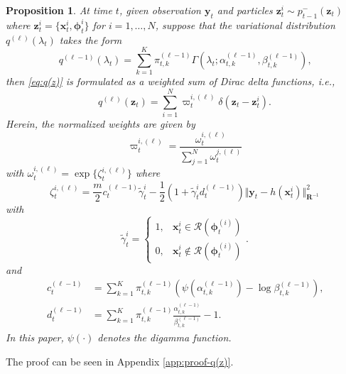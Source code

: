 \documentclass[10pt,twocolumn,twoside]{IEEEtran}
\newtheorem{proposition}{Proposition}
\newcommand{\cm}{\text{,}} %
\newcommand{\fs}{\text{.}} %
\newcommand{\x}{{ \bm{x} }}
\newcommand{\y}{{ \bm{y} }}
\newcommand{\z}{{ \bm{z} }}
\begin{document}
\begin{proposition} \label{prop:q(z)}
At time $t$, given observation $\y_t$ and particles $\z_t^i\sim p^-_{t-1}(\z_t)$ where $\z_t^i=\{\x_t^i,\bm\phi_t^i\}$ for $i=1,\dots,N$, suppose that the variational distribution $q^{(\ell)}(\lambda_t)$ takes the form 
$$q^{(\ell-1)}(\lambda_t)=\sum_{k=1}^K\pi_{t,k}^{(\ell-1)}\Gamma(\lambda_t;\alpha_{t,k}^{(\ell-1)},\beta_{t,k}^{(\ell-1)})\cm$$
then \eqref{eq:q(z)} is formulated as a weighted sum of Dirac delta functions, i.e.,
\begin{equation} \label{eq:q(l)(z)}
    q^{(\ell)}(\z_t) = \sum_{i=1}^{N}\varpi_t^{i,(\ell)}\delta(\z_t-\z_t^i) \fs
\end{equation}
Herein, the normalized weights are given by
$$
\varpi_t^{i,(\ell)}=\frac{\omega_t^{i,(\ell)}}{\sum_{j=1}^N\omega_t^{j,(\ell)}}
$$
with $\omega^{i,(\ell)}_t=\exp\{\zeta^{i,(\ell)}_t\}$ where
\begin{equation} \label{eq:weights}
    \zeta^{i,(\ell)}_t = \frac{m}{2}c_t^{(\ell-1)}\tilde\gamma_t^i-\frac{1}{2}(1+\tilde\gamma_t^id_t^{(\ell-1)})\Vert\y_t-h(\x_t^i)\Vert^2_{\bm{R}^{-1}}
\end{equation}
with
\begin{equation} \label{eq:~gamma}
    \tilde\gamma_t^i = \begin{cases}
        1, & \x_t^i\in\mathcal{R}(\bm\phi_t^{(i)}) \\
        0, & \x_t^i\notin\mathcal{R}(\bm\phi_t^{(i)}) 
    \end{cases} \fs
\end{equation}
and
\begin{align}
    c_t^{(\ell-1)} &= \sum_{k=1}^K\pi_{t,k}^{(\ell-1)}\left(\psi(\alpha_{t,k}^{(\ell-1)})-\log\beta_{t,k}^{(\ell-1)}\right)\cm \label{eq:c}\\
    d_t^{(\ell-1)} &= \sum_{k=1}^K\pi_{t,k}^{(\ell-1)}\frac{\alpha_{t,k}^{(\ell-1)}}{\beta_{t,k}^{(\ell-1)}}-1\fs \label{eq:d}
\end{align}
In this paper, $\psi(\cdot)$ denotes the {\it digamma function}.
\end{proposition}
\begin{IEEEproof}
    The proof can be seen in Appendix \ref{app:proof-q(z)}.
\end{IEEEproof}
\end{document}
